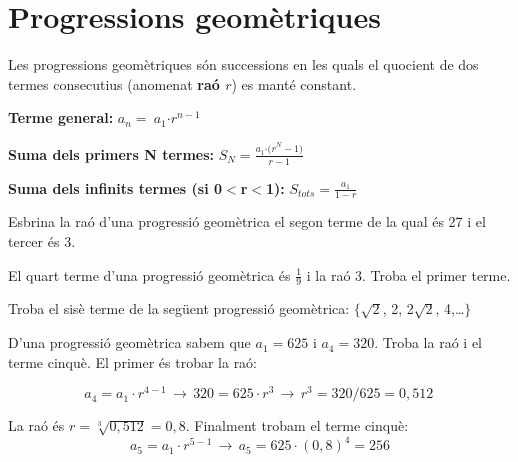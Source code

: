 
\section{Progressions geomètriques}

\begin{theorybox}


  Les progressions geomètriques són successions en les quals el quocient de dos termes consecutius (anomenat \textbf{raó $r$}) es manté constant. 

  \textbf{Terme general: }  $a_n=\ a_1{\textrm{·}r}^{n-1}$

 \textbf{     Suma dels primers N termes:}  $S_N=\frac{a_1{\textrm{·}(r}^N-1)}{r-1}\ $

 \textbf{     Suma dels infinits termes (si 0$\boldsymbol{<}$r$\boldsymbol{<}$1):} $S_{tots}=\frac{a_1}{1-r}$
\end{theorybox}


\begin{mylist}

\exer \spen Esbrina la raó d'una progressió geomètrica el segon terme de la qual és 27 i el tercer és 3.
\vso
{}

\exer \spen  El quart terme d'una progressió geomètrica és $\frac{1}{9}$ i la raó 3. Troba el primer terme.
\vso
{}

\exer  Troba el sisè terme de la següent progressió geomètrica: $\{$$\sqrt{2} $, 2, 2$\sqrt{2} $, 4,{\dots}$\}$

\end{mylist}

\begin{resolt}[E]{
		D'una progressió geomètrica sabem que $a_1=625$ i $a_4=320$. Troba la raó i el terme cinquè.
	}
	El primer és trobar la raó:
	
	\[ a_4 = a_1 \cdot r^{4-1}  \, \rightarrow \, 320 = 625 \cdot r^3 \, \rightarrow \,  r^3 = 320/625=0,512 \,   \]
	
	La raó és $ r=\sqrt[3]{0,512}=0,8$. Finalment trobam el terme cinquè:
	\[ a_5 = a_1 \cdot r^{5-1}  \, \rightarrow \, a_5 = 625 \cdot (0,8)^4 = 256  \]
	
\end{resolt}

